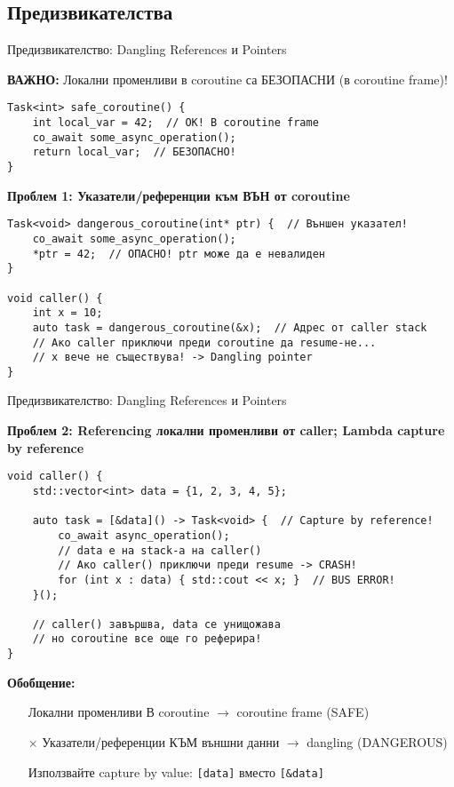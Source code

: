 \documentclass[aspectratio=169]{beamer}
\begin{document}
\subsection{Предизвикателства}

\begin{frame}[fragile]{Предизвикателство: Dangling References и Pointers}

\textbf{ВАЖНО:} Локални променливи в coroutine са БЕЗОПАСНИ (в coroutine frame)!

\begin{lstlisting}[basicstyle=\ttfamily\tiny]
Task<int> safe_coroutine() {
    int local_var = 42;  // OK! В coroutine frame
    co_await some_async_operation();
    return local_var;  // БЕЗОПАСНО!
}
\end{lstlisting}

\textbf{Проблем 1: Указатели/референции към ВЪН от coroutine}

\begin{lstlisting}[basicstyle=\ttfamily\tiny]
Task<void> dangerous_coroutine(int* ptr) {  // Външен указател!
    co_await some_async_operation();
    *ptr = 42;  // ОПАСНО! ptr може да е невалиден
}

void caller() {
    int x = 10;
    auto task = dangerous_coroutine(&x);  // Адрес от caller stack
    // Ако caller приключи преди coroutine да resume-не...
    // x вече не съществува! -> Dangling pointer
}
\end{lstlisting}
\end{frame}

\begin{frame}[fragile]{Предизвикателство: Dangling References и Pointers}

\textbf{Проблем 2: Referencing локални променливи от caller; Lambda capture by reference}

\begin{lstlisting}[basicstyle=\ttfamily\tiny]
void caller() {
    std::vector<int> data = {1, 2, 3, 4, 5};
    
    auto task = [&data]() -> Task<void> {  // Capture by reference!
        co_await async_operation();
        // data е на stack-а на caller()
        // Ако caller() приключи преди resume -> CRASH!
        for (int x : data) { std::cout << x; }  // BUS ERROR!
    }();
    
    // caller() завършва, data се унищожава
    // но coroutine все още го реферира!
}
\end{lstlisting}

\textbf{Обобщение:}
\begin{itemize}
    \item[\checkmark] Локални променливи В coroutine $\rightarrow$ coroutine frame (SAFE)
    \item[$\times$] Указатели/референции КЪМ външни данни $\rightarrow$ dangling (DANGEROUS)
    \item[\checkmark] Използвайте capture by value: \texttt{[data]} вместо \texttt{[\&data]}
\end{itemize}
\end{frame}
\end{document}
